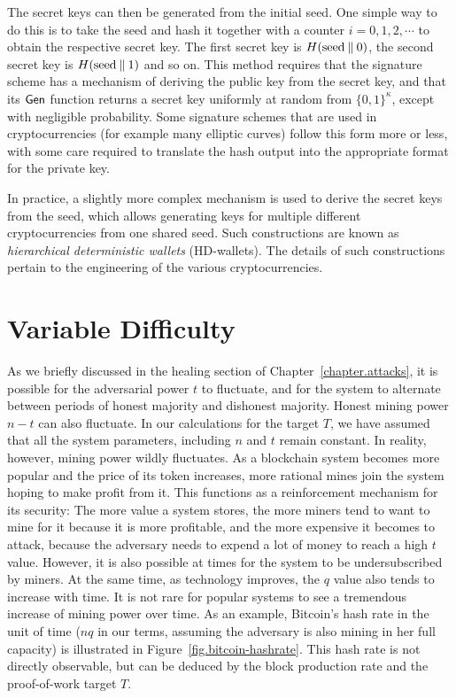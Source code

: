 The secret keys can then be generated from the initial seed. One simple way to do
this is to take the seed and hash it together with a counter $i = 0, 1, 2, \cdots$
to obtain the respective secret key. The first secret key is $H(\mathrm{seed} \mathbin{\|} 0)$,
the second secret key is $H(\mathrm{seed} \mathbin{\|} 1)$ and so on.
This method requires that the signature scheme has a mechanism of deriving
the public key from the secret key, and that its $\mathsf{Gen}$ function returns a
secret key uniformly at random from $\{0, 1\}^\kappa$, except with negligible
probability. Some signature schemes that are used in cryptocurrencies (for example
many elliptic curves) follow this form more or less, with some care required to
translate the hash output into the appropriate format for the private key.

In practice, a slightly more complex mechanism is used to derive the secret keys from
the seed, which allows generating keys for multiple different cryptocurrencies from
one shared seed. Such constructions are known as \emph{hierarchical deterministic wallets}
(HD-wallets). The details of such constructions
pertain to the engineering of the various cryptocurrencies.


\section{Variable Difficulty}

As we briefly discussed in the healing section of Chapter~\ref{chapter.attacks},
it is possible for the adversarial power $t$ to fluctuate, and for the system to
alternate between periods of honest majority and dishonest majority.
Honest mining power $n - t$ can also fluctuate. In our calculations for the target $T$,
we have assumed that all the system parameters, including $n$ and $t$ remain
constant. In reality, however, mining power wildly fluctuates. As a blockchain
system becomes more popular and the price of its token increases,
more rational mines join the system hoping to make profit from it. This functions
as a reinforcement mechanism for its security: The more value a system stores,
the more miners tend to want to mine for it because it is more profitable, and
the more expensive it becomes to attack, because the adversary needs to
expend a lot of money to reach a high $t$ value. However, it is also possible
at times for the system to be undersubscribed by miners.
At the same time, as technology improves, the $q$ value also tends to increase with time.
It is not rare for popular systems to see a tremendous increase of mining
power over time. As an example, Bitcoin's hash rate in the unit of time ($nq$
in our terms, assuming the adversary is also mining in her full capacity)
is illustrated in Figure~\ref{fig.bitcoin-hashrate}. This
hash rate is not directly observable, but can be deduced by the block
production rate and the proof-of-work target $T$.

